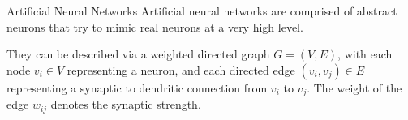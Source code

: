 \begin{frame}{Artificial Neural Networks}
Artificial neural networks are comprised of abstract neurons that try
to mimic real neurons at a very high level. 

\medskip

They can be described via a
weighted directed graph $G=(V,E)$, with each node $v_i \in V$ representing
a neuron, and each directed edge $(v_i, v_j) \in E$ representing a synaptic
to dendritic connection from $v_i$ to $v_j$. The weight of the edge $w_{ij}$
denotes the synaptic strength. %
%

	\medskip

\end{frame}
%
%

